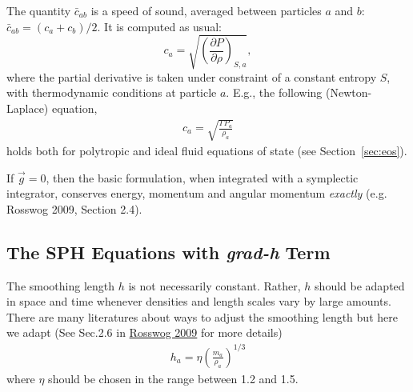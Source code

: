 \documentclass[notes.tex]{subfiles}
\begin{document}
The quantity $\bar{c}_{ab}$ is a speed of sound, averaged between particles
$a$ and $b$: $\bar{c}_{ab} = (c_a + c_b)/2$. It is computed as usual:
\begin{equation}
c_a = \sqrt{\left(\frac{\partial P}{\partial \rho}\right)_{S,a}},
\end{equation}
where the partial derivative is taken under constraint of a constant entropy
$S$, with thermodynamic conditions at particle $a$.
E.g., the following (Newton-Laplace) equation,
\begin{align}
  c_a = \sqrt{\frac{\Gamma P_a}{\rho_a}}
\end{align}
holds both for polytropic and ideal fluid equations of state (see
Section~\ref{sec:eos}).

If $\vec{g}=0$, then the basic formulation, when integrated with a symplectic
integrator, conserves energy, momentum and angular momentum \emph{exactly}
(e.g. Rosswog 2009, Section 2.4).

\subsection{The SPH Equations with {\it grad-h} Term}
The smoothing length $h$ is not necessarily constant. Rather, $h$ should 
be adapted in space and time whenever densities and length scales vary 
by large amounts. There are many literatures about ways to adjust the 
smoothing length but here we adapt 
(See Sec.2.6 in \href{https://arxiv.org/pdf/0903.5075.pdf}{Rosswog 2009} for more details)
\begin{align}
\label{eqn:grad-h:adap-h}
h_a = \eta \left( \frac{m_a}{\rho_a} \right)^{1/3} 
\end{align}
where $\eta$ should be chosen in the range between 1.2 and 1.5.
\end{document}
